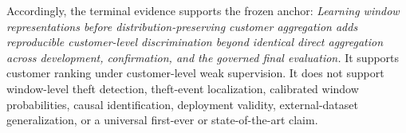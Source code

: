 Accordingly, the terminal evidence supports the frozen anchor: \emph{Learning window representations before distribution-preserving customer aggregation adds reproducible customer-level discrimination beyond identical direct aggregation across development, confirmation, and the governed final evaluation.} It supports customer ranking under customer-level weak supervision. It does not support window-level theft detection, theft-event localization, calibrated window probabilities, causal identification, deployment validity, external-dataset generalization, or a universal first-ever or state-of-the-art claim.
